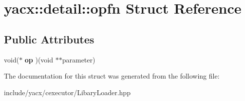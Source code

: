 \hypertarget{structyacx_1_1detail_1_1opfn}{}\section{yacx\+:\+:detail\+:\+:opfn Struct Reference}
\label{structyacx_1_1detail_1_1opfn}
\subsection*{Public Attributes}
\begin{DoxyCompactItemize}
\item 
\mbox{\label{structyacx_1_1detail_1_1opfn_a515ca6f9478e17083fe63dd7e53f57b7}} 
void($\ast$ {\bfseries op} )(void $\ast$$\ast$parameter)
\end{DoxyCompactItemize}


The documentation for this struct was generated from the following file\+:\begin{DoxyCompactItemize}
\item 
include/yacx/cexecutor/Libary\+Loader.\+hpp\end{DoxyCompactItemize}
